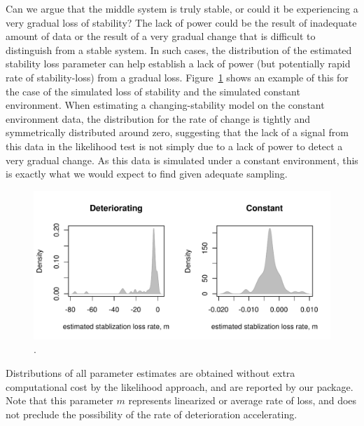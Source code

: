 \documentclass[authoryear, preprint,review,12pt]{elsarticle}
\begin{document}
Can we argue that the middle system is truly stable, or could it be experiencing a very gradual loss of stability? The lack of power could be the result of inadequate amount of data or the result of a very gradual change that is difficult to distinguish from  a stable system.  In such cases, the distribution of the estimated stability loss parameter can help establish a lack of power (but potentially rapid rate of stability-loss) from a gradual loss.  Figure~\ref{fig:par} shows an example of this for the case of the simulated loss of stability and the simulated constant environment.  When estimating a changing-stability model on the constant environment data, the distribution for the rate of change is tightly and symmetrically distributed around zero, suggesting that the lack of a signal from this data in the likelihood test is not simply due to a lack of power to detect a very gradual change.  As this data is simulated under a constant environment, this is exactly what we would expect to find given adequate sampling.  

\begin{figure}
\begin{center}
\includegraphics[width=\textwidth]{parameter_dist.pdf}
\end{center}
\caption{.}
\label{fig:par}
\end{figure}

Distributions of all parameter estimates are obtained without extra computational cost by the likelihood approach, and are reported by our package.  Note that this parameter $m$ represents linearized or average rate of loss, and does not preclude the possibility of the rate of deterioration accelerating.  
\end{document}
